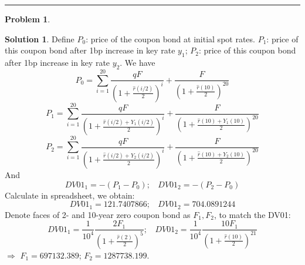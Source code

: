 \documentclass[a4paper, 10pt]{article}
\theoremstyle{definition}
\newtheorem{problem}{Problem}
\theoremstyle{hSol}
\newtheorem*{solution}{Solution}
\begin{document}
\noindent\rule{16cm}{0.4pt}
\begin{problem}
\end{problem}
\begin{solution} Define $P_0$: price of the coupon bond at initial spot rates. $P_1$: price of this coupon bond after 1bp increase in key rate $y_1$; $P_2$: price of this coupon bond after 1bp increase in key rate $y_2$. We have
$$
P_0 = \sum_{i=1}^{20}\frac{qF}{(1+\frac{\hat{r}(i/2)}{2})^{i}} + \frac{F}{(1+\frac{\hat{r}(10)}{2})^{20}}
$$
$$
P_1 = \sum_{i=1}^{20}\frac{qF}{(1+\frac{\hat{r}(i/2)+Y_1(i/2)}{2})^{i}} + \frac{F}{(1+\frac{\hat{r}(10)+Y_1(10)}{2})^{20}}
$$
$$
P_2 = \sum_{i=1}^{20}\frac{qF}{(1+\frac{\hat{r}(i/2)+Y_2(i/2)}{2})^{i}} + \frac{F}{(1+\frac{\hat{r}(10)+Y_2(10)}{2})^{20}}
$$
And 
$$
DV01_1 = -\left(P_1 - P_0\right);~~~~DV01_2 = -\left(P_2 - P_0\right)
$$
Calculate in spreadsheet, we obtain:
$$
DV01_1 = 121.7407866;~~~~DV01_2 = 704.0891244
$$
Denote faces of 2- and 10-year zero coupon bond as $F_1, F_2$, to match the DV01:
$$
DV01_1 = \frac{1}{10^4}\frac{2F_1}{(1+\frac{\hat{r}(2)}{2})^{5}};~~~~DV01_2 = \frac{1}{10^4}\frac{10F_1}{(1+\frac{\hat{r}(10)}{2})^{21}}
$$
$\Rightarrow$ $F_1= 697132.389$; $F_2= 1287738.199$.
\end{solution}
\end{document}

